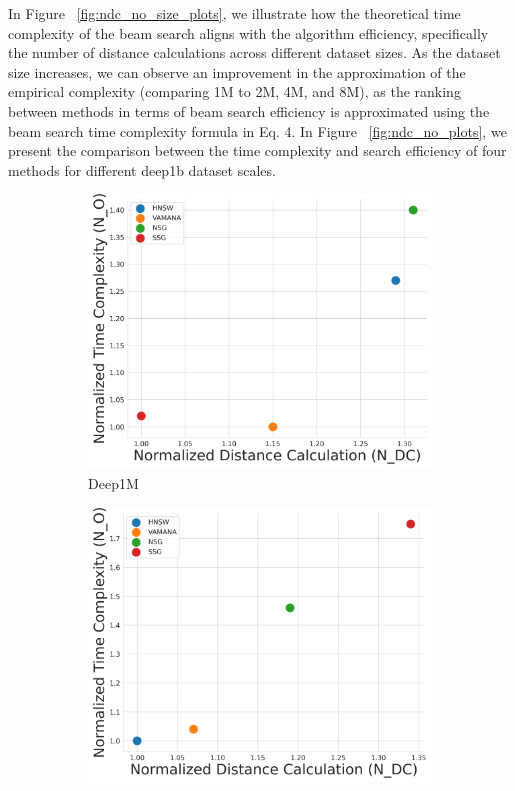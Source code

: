 In Figure ~\ref{fig:ndc_no_size_plots}, we illustrate how the theoretical time complexity of the beam search aligns with the algorithm efficiency, specifically the number of distance calculations across different dataset sizes. As the dataset size increases, we can observe an improvement in the approximation of the empirical complexity (comparing 1M to 2M, 4M, and 8M), as the ranking between methods in terms of beam search efficiency is approximated using the beam search time complexity formula in Eq. 4.
In Figure ~\ref{fig:ndc_no_plots}, we present the comparison between the time complexity and search efficiency of four methods for different deep1b dataset scales.

\begin{figure}[htbp]
\centering
\begin{subfigure}{0.24\textwidth}
  \centering
  \includegraphics[width=\linewidth]{../img/Experiments/BSC/1_ndc_no.png}
  \caption{Deep1M}
  \label{fig:1_ndc_no}
\end{subfigure}
\hfill
\begin{subfigure}{0.24\textwidth}
  \centering
  \includegraphics[width=\linewidth]{../img/Experiments/BSC/2_ndc_no.png}

\end{subfigure}
\end{figure}
